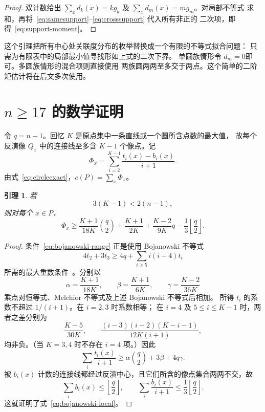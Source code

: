 \documentclass[11pt,a4paper]{ctexart}
\newtheorem{lemma}[theorem]{引理}
\theoremstyle{definition}
\begin{document}
\begin{proof}
双计数给出 $\sum_xd_k(x)=kg_k$ 及 $\sum_xd_m(x)=mg_m$。对局部不等式
求和，再将~\eqref{eq:samesupport}--\eqref{eq:crosssupport} 代入所有非正的
二次项，即得~\eqref{eq:support-moment}。
\end{proof}

这个引理把所有中心处关联度分布的枚举替换成一个有限的不等式拟合问题：
只需为有限表中的局部最小值寻找形如上式的二次下界。
单圆族情形令 $d_m=0$即可。多圆族情形的混合项则直接使用
两族圆两两至多交于两点。这个简单的二阶矩估计将在后文多次使用。

\section{\texorpdfstring{$n\ge17$}{n>=17} 的数学证明}

令 \(q=n-1\)。回忆 \(K\) 是原点集中一条直线或一个圆所含点数的最大值，
故每个反演像 \(Q_x\) 中的连接线至多含 \(K-1\) 个像点。记
\[
\Phi_x=\sum_{i=2}^{K-1}\frac{t_i(x)-b_i(x)}{i+1}.
\]
由式~\eqref{eq:circleexact}，\(c(P)=\sum_x\Phi_x\)。

\begin{lemma}\label{lem:bojanowski-local}
若
\begin{equation}\label{eq:bojanowski-range}
 3(K-1)<2(n-1),
\end{equation}
则对每个 \(x\in P\)，
\begin{equation}\label{eq:bojanowski-local}
\Phi_x\ge
 \frac{K+1}{18K}\binom q2+\frac{K+1}{2K}
 +\frac{K-2}{9K}q-\frac13\left\lfloor\frac q2\right\rfloor.
\end{equation}
\end{lemma}

\begin{proof}
条件~\eqref{eq:bojanowski-range} 正是使用 Bojanowski 不等式
\[
4t_2+3t_3\ge4q+\sum_{i\ge5}i(i-4)t_i
\]
所需的最大重数条件~\cite[Theorem~2.1]{pokora}。分别以
\[
 \alpha=\frac{K+1}{18K},\qquad
 \beta=\frac{K+1}{6K},\qquad
 \gamma=\frac{K-2}{36K}
\]
乘点对恒等式、Melchior 不等式及上述 Bojanowski 不等式后相加。
所得 \(t_i\) 的系数不超过 \(1/(i+1)\)。在 \(i=2,3\) 时系数相等；
在 \(i=4\) 及 \(5\le i\le K-1\) 时，两者之差分别为
\[
 \frac{K-5}{30K},\qquad
 \frac{(i-3)(i-2)(K-i-1)}{12K(i+1)},
\]
均非负。（当 \(K=3,4\) 时不存在 \(i=4\) 项。）因此
\[
 \sum_i\frac{t_i(x)}{i+1}\ge
 \alpha\binom q2+3\beta+4q\gamma.
\]
被 \(b_i(x)\) 计数的连接线都经过反演中心，且它们所含的像点集合两两不交，故
\[
 \sum_i b_i(x)\le\left\lfloor\frac q2\right\rfloor,\qquad
 \sum_i\frac{b_i(x)}{i+1}\le
 \frac13\left\lfloor\frac q2\right\rfloor.
\]
这就证明了式~\eqref{eq:bojanowski-local}。
\end{proof}
\end{document}

